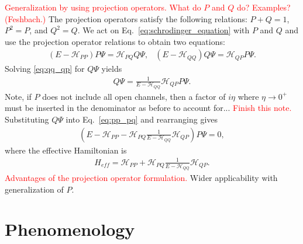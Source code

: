 \documentclass[preprintnumbers,floatfix,aps,prc,preprint,nofootinbib]{revtex4-1}
\begin{document}
\textcolor{red}{Generalization by using projection operators. What do $P$ and $Q$ do? Examples? (Feshbach.)} The projection operators satisfy the following relations: $P+Q=1$, $P^2 = P$, and $Q^2 = Q$. We act on Eq.~\ref{eq:schrodinger_equation} with $P$ and $Q$ and use the projection operator relations to obtain two equations:
%
\begin{subequations}
	\label{eq:intermediate_effective_hamiltonian_equations}
	\begin{eqnarray}
		\label{eq:pp_pq}
		(E - \mathcal{H}_{PP}) P \Psi = \mathcal{H}_{PQ} Q \Psi,
	\end{eqnarray}
	\begin{eqnarray}
		\label{eq:qq_qp}
		(E - \mathcal{H}_{QQ}) Q \Psi = \mathcal{H}_{QP} P \Psi.
	\end{eqnarray}
\end{subequations}
%
Solving \ref{eq:qq_qp} for $Q \Psi$ yields
%
\begin{eqnarray}
	\label{eq:q_psi}
	Q \Psi = \frac{1}{E - \mathcal{H}_{QQ}} \mathcal{H}_{QP} P \Psi.
\end{eqnarray}
%
Note, if $P$ does not include all open channels, then a factor of $i \eta$ where $\eta \rightarrow 0^+$ must be inserted in the denominator as before to account for... \textcolor{red}{Finish this note.} Substituting $Q \Psi$ into Eq.~\ref{eq:pp_pq} and rearranging gives
%
\begin{eqnarray}
	\label{p_psi}
	(E - \mathcal{H}_{PP} - \mathcal{H}_{PQ} \frac{1}{E - \mathcal{H}_{QQ}} \mathcal{H}_{QP}) P \Psi = 0,
\end{eqnarray}
%
where the effective Hamiltonian is
%
\begin{eqnarray}
	\label{eq:effective_hamiltonian}
	H_{eff} = \mathcal{H}_{PP} + \mathcal{H}_{PQ} \frac{1}{E - \mathcal{H}_{QQ}} \mathcal{H}_{QP}.
\end{eqnarray}
%
\textcolor{red}{Advantages of the projection operator formulation.} Wider applicability with generalization of $P$.	


\section{Phenomenology}
\label{sec:phenomenology}
\end{document}
